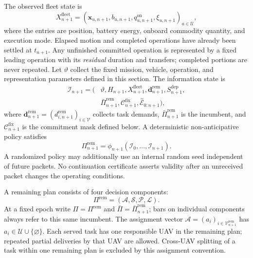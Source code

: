 The observed fleet state is
\begin{equation}
X_{n+1}^{\mathrm{fleet}}
=\left(\mathbf x_{u,n+1},b_{u,n+1},
q_{u,n+1}^{\mathrm{on}},\xi_{u,n+1}\right)_{u\in\mathcal U},
\label{eq:fleet_state}
\end{equation}
where the entries are position, battery energy, onboard commodity quantity, and
execution mode. Elapsed motion and completed operations have already been
settled at $t_{n+1}$. Any unfinished committed operation is represented by a
fixed leading operation with its \emph{residual} duration and transfers;
completed portions are never repeated.
Let $\vartheta$ collect the fixed mission, vehicle, operation, and
representation parameters defined in this section. The information state is
\begin{equation}
\begin{split}
\mathscr I_{n+1}=\bigl(&\vartheta,H_{n+1},X_{n+1}^{\mathrm{fleet}},
\mathbf d_{n+1}^{\mathrm{rem}},S_{n+1}^{\mathrm{dep}},\\
&\bar\Pi_{n+1}^{\mathrm{rem}},\mathcal C_{n+1}^{\mathrm{fix}},
\widehat{\mathcal E}_{0:n+1}\bigr),
\end{split}
\label{eq:information_state}
\end{equation}
where $\mathbf d_{n+1}^{\mathrm{rem}}=(d_{i,n+1}^{\mathrm{rem}})_{i\in\mathcal V}$
collects task demands, $\bar\Pi_{n+1}^{\mathrm{rem}}$ is the incumbent, and
$\mathcal C_{n+1}^{\mathrm{fix}}$ is the commitment mask defined below.
A deterministic non-anticipative policy satisfies
\begin{equation}
\Pi_{n+1}^{\mathrm{rem}}
=\phi_{n+1}(\mathscr I_0,\ldots,\mathscr I_{n+1}).
\label{eq:nonanticipativity}
\end{equation}
A randomized policy may additionally use an internal random seed independent
of future packets. No continuation certificate asserts validity after an
unreceived packet changes the operating conditions.

A remaining plan consists of four decision components:
\begin{equation}
\Pi^{\mathrm{rem}}=(\mathcal A,\mathcal S,\mathcal P,\mathcal L).
\label{eq:remaining_plan}
\end{equation}
At a fixed epoch write $\Pi=\Pi^{\mathrm{rem}}$ and
$\bar\Pi=\bar\Pi_{n+1}^{\mathrm{rem}}$; bars on individual components
always refer to this same incumbent.
The assignment vector $\mathcal A=(a_i)_{i\in\mathcal V_{n+1}^{\mathrm{rem}}}$
has $a_i\in\mathcal U\cup\{\varnothing\}$. Each served task has one
responsible UAV in the remaining plan; repeated partial deliveries by that
UAV are allowed. Cross-UAV splitting of a task within one remaining plan is
excluded by this assignment convention.

